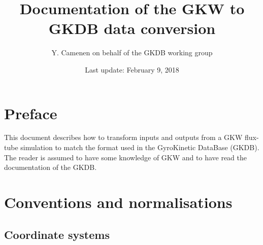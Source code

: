 \documentclass[a4paper]{report}
\begin{document}
\title{Documentation of the GKW to GKDB data conversion}

\author{Y. Camenen on behalf of the GKDB working group}

\date{Last update: February 9, 2018}

\maketitle

\chapter{Preface}
This document describes how to transform inputs and outputs from a GKW flux-tube simulation to match the format used in the GyroKinetic DataBase (GKDB).  
The reader is assumed to have some knowledge of GKW and to have read the documentation of the GKDB.

\tableofcontents

\chapter{Conventions and normalisations}

\section{Coordinate systems}
\end{document}
